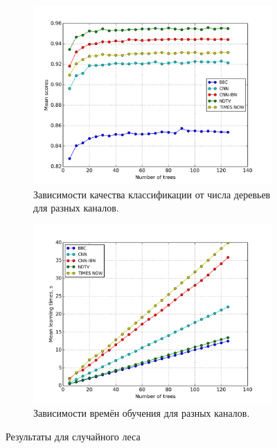 \begin{figure}[h!]
    \centering
	\begin{subfigure}{0.45\textwidth}
		\includegraphics[width=\textwidth]{images/randfor.png}
		\caption{Зависимости качества классификации от числа деревьев для разных каналов.}
	\end{subfigure}
	\begin{subfigure}{0.45\textwidth}
		\includegraphics[width=\textwidth]{images/randforTime.png}
		\caption{Зависимости времён обучения для разных каналов.}
	\end{subfigure}
	\caption{Результаты для случайного леса}\label{fig:randfor-base}
\end{figure}

